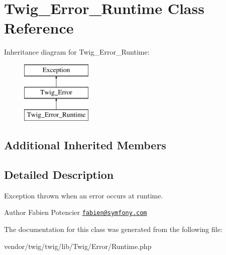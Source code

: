 \hypertarget{classTwig__Error__Runtime}{}\section{Twig\+\_\+\+Error\+\_\+\+Runtime Class Reference}
\label{classTwig__Error__Runtime}
Inheritance diagram for Twig\+\_\+\+Error\+\_\+\+Runtime\+:\begin{figure}[H]
\begin{center}
\leavevmode
\includegraphics[height=3.000000cm]{classTwig__Error__Runtime}
\end{center}
\end{figure}
\subsection*{Additional Inherited Members}


\subsection{Detailed Description}
Exception thrown when an error occurs at runtime.

\begin{DoxyAuthor}{Author}
Fabien Potencier \href{mailto:fabien@symfony.com}{\tt fabien@symfony.\+com} 
\end{DoxyAuthor}


The documentation for this class was generated from the following file\+:\begin{DoxyCompactItemize}
\item 
vendor/twig/twig/lib/\+Twig/\+Error/Runtime.\+php\end{DoxyCompactItemize}
